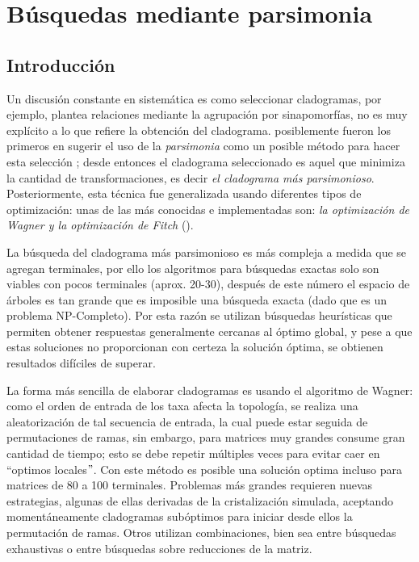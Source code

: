 
\chapter{B\'usquedas mediante parsimonia} %
\label{cha:parsimonia}

\section*{Introducci\'on} 

Un discusi\'on constante en sistem\'atica es como seleccionar cladogramas, por ejemplo, \cite{Hennig1968} plantea relaciones mediante la agrupaci\'on por sinapomorf\'ias, no es muy expl\'icito a lo que refiere la obtenci\'on del cladograma. \cite{Camin1965} posiblemente fueron los primeros en sugerir el uso de la \textit{parsimonia} como un posible m\'etodo para hacer esta selecci\'on \cite{Camin1965}; desde entonces el cladograma seleccionado es aquel que minimiza la cantidad de transformaciones, es decir \textit{el cladograma m\'as parsimonioso}. Posteriormente, esta t\'ecnica fue generalizada usando diferentes tipos de optimizaci\'on: unas de las m\'as conocidas e implementadas son: \textit{la optimizaci\'on de Wagner y la optimizaci\'on de Fitch} (\cite{Wagner1961,KlugeFarris1969,Farris1970,Fitch1971}).

La b\'usqueda del cladograma m\'as parsimonioso es m\'as compleja a medida que se agregan terminales,  por ello los algoritmos para b\'usquedas exactas solo son viables con pocos terminales (aprox. 20-30),  despu\'es de este n\'umero el espacio de \'arboles es tan grande que es imposible una b\'usqueda exacta (dado que es un problema NP-Completo). Por esta raz\'on se utilizan b\'usquedas heur\'isticas que permiten obtener respuestas generalmente cercanas al \'optimo global,  y pese a que estas soluciones no proporcionan con certeza la soluci\'on \'optima, se obtienen resultados  dif\'iciles de superar.


La forma m\'as sencilla de elaborar cladogramas es usando el algoritmo de Wagner: como el orden de entrada de los taxa afecta la topolog\'ia,  se realiza una aleatorizaci\'on de tal secuencia de entrada, %
la cual puede estar seguida de permutaciones de ramas, sin embargo, para matrices muy grandes consume gran cantidad de tiempo; esto se debe repetir m\'ultiples veces para evitar caer en ``optimos locales$"$. Con este m\'etodo es posible una soluci\'on optima incluso para matrices de 80 a 100 terminales. Problemas m\'as grandes requieren nuevas estrategias,  algunas de ellas derivadas de la cristalizaci\'on simulada,  aceptando moment\'aneamente cladogramas sub\'optimos para iniciar desde ellos la permutaci\'on de ramas. Otros utilizan combinaciones, bien sea entre b\'usquedas exhaustivas o entre b\'usquedas sobre reducciones de la matriz.

